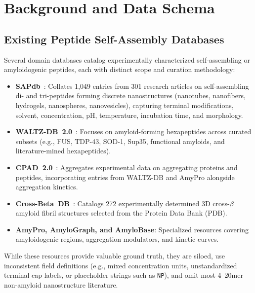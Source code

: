 \section{Background and Data Schema}
\label{sec:background}

\subsection{Existing Peptide Self-Assembly Databases}
Several domain databases catalog experimentally characterized self-assembling or amyloidogenic peptides, each with distinct scope and curation methodology:
\begin{itemize}
    \item \textbf{SAPdb}~\cite{sapdb2020}: Collates 1,049 entries from 301 research articles on self-assembling di- and tri-peptides forming discrete nanostructures (nanotubes, nanofibers, hydrogels, nanospheres, nanovesicles), capturing terminal modifications, solvent, concentration, pH, temperature, incubation time, and morphology.
    \item \textbf{WALTZ-DB~2.0}~\cite{waltzdb2020}: Focuses on amyloid-forming hexapeptides across curated subsets (e.g., FUS, TDP-43, SOD-1, Sup35, functional amyloids, and literature-mined hexapeptides).
    \item \textbf{CPAD~2.0}~\cite{cpad2020}: Aggregates experimental data on aggregating proteins and peptides, incorporating entries from WALTZ-DB and AmyPro alongside aggregation kinetics.
    \item \textbf{Cross-Beta~DB}~\cite{crossbetadb2024}: Catalogs 272 experimentally determined 3D cross-$\beta$ amyloid fibril structures selected from the Protein Data Bank (PDB).
    \item \textbf{AmyPro, AmyloGraph, and AmyloBase}: Specialized resources covering amyloidogenic regions, aggregation modulators, and kinetic curves.
\end{itemize}
While these resources provide valuable ground truth, they are siloed, use inconsistent field definitions (e.g., mixed concentration units, unstandardized terminal cap labels, or placeholder strings such as \texttt{NP}), and omit most 4--20mer non-amyloid nanostructure literature.

